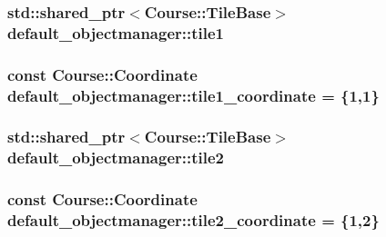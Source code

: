 \hypertarget{classdefault__objectmanager_a083c627bb3cb830a59837af57933274e}{
\subsubsection[{tile1}]{\setlength{\rightskip}{0pt plus 5cm}std\-::shared\-\_\-ptr$<${\bf Course\-::\-Tile\-Base}$>$ default\-\_\-objectmanager\-::tile1\hspace{0.3cm}{\ttfamily [private]}}}\label{classdefault__objectmanager_a083c627bb3cb830a59837af57933274e}
\hypertarget{classdefault__objectmanager_ac534d6d0d5db5425a0aeb95c84a6da17}{
\subsubsection[{tile1\-\_\-coordinate}]{\setlength{\rightskip}{0pt plus 5cm}const {\bf Course\-::\-Coordinate} default\-\_\-objectmanager\-::tile1\-\_\-coordinate = \{1,1\}\hspace{0.3cm}{\ttfamily [private]}}}\label{classdefault__objectmanager_ac534d6d0d5db5425a0aeb95c84a6da17}
\hypertarget{classdefault__objectmanager_a822a88e652f6af04e9046f011844a12c}{
\subsubsection[{tile2}]{\setlength{\rightskip}{0pt plus 5cm}std\-::shared\-\_\-ptr$<${\bf Course\-::\-Tile\-Base}$>$ default\-\_\-objectmanager\-::tile2\hspace{0.3cm}{\ttfamily [private]}}}\label{classdefault__objectmanager_a822a88e652f6af04e9046f011844a12c}
\hypertarget{classdefault__objectmanager_a4c05b0c625dbbba4823e475d5cebc4d4}{
\subsubsection[{tile2\-\_\-coordinate}]{\setlength{\rightskip}{0pt plus 5cm}const {\bf Course\-::\-Coordinate} default\-\_\-objectmanager\-::tile2\-\_\-coordinate = \{1,2\}\hspace{0.3cm}{\ttfamily [private]}}}\label{classdefault__objectmanager_a4c05b0c625dbbba4823e475d5cebc4d4}
